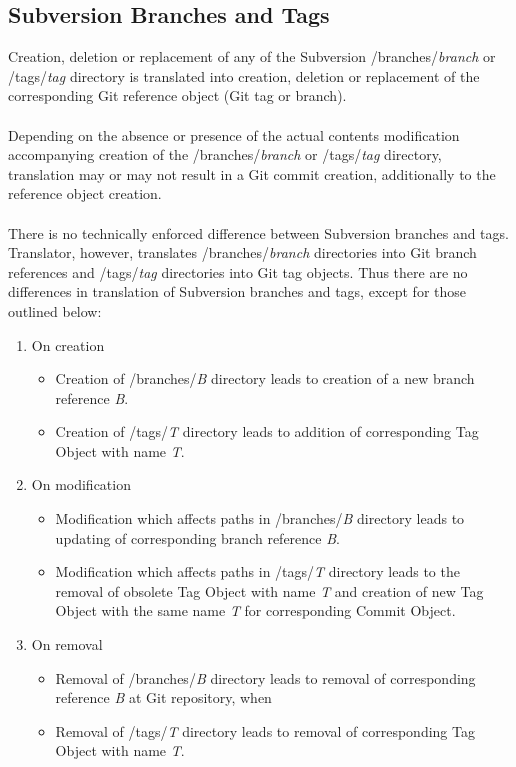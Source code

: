 \subsection{Subversion Branches and Tags}
\label{section_branches_and_tags}
\renewcommand{\figurename}{Diagram}

Creation, deletion or replacement of any of the Subversion /branches/\emph{branch} or /tags/\emph{tag} directory
is translated into creation, deletion or replacement of the corresponding Git reference object (Git tag or branch). 
\\\\
Depending on the absence or presence of the actual contents modification accompanying creation of the /branches/\emph{branch} 
or /tags/\emph{tag} directory, translation may or may not result in a Git commit creation, additionally 
to the reference object creation.
\\\\
There is no technically enforced difference between Subversion branches and tags. Translator, however, translates
/branches/\emph{branch} directories into Git branch references and /tags/\emph{tag} directories into Git tag objects.
Thus there are no differences in translation of Subversion branches and tags, except for those outlined below:
\begin{enumerate}
	\compactlist
	\item On creation
	\begin{itemize}
		\item Creation of /branches/\emph{B} directory leads to creation of a new branch reference \emph{B}.
		\item Creation of /tags/\emph{T} directory leads to addition of corresponding Tag Object with name \emph{T}.
	\end{itemize}
	\item On modification
	\begin{itemize}
		\item Modification which affects paths in /branches/\emph{B} directory leads to updating of corresponding branch reference \emph{B}.
		\item Modification which affects paths in /tags/\emph{T} directory leads to the removal of obsolete Tag Object with name \emph{T} and creation of new Tag Object with the same name \emph{T} for corresponding Commit Object.
	\end{itemize}
	\item On removal
	\begin{itemize}
		\item Removal of /branches/\emph{B} directory leads to removal of corresponding reference \emph{B} at Git repository, when
		\item Removal of /tags/\emph{T} directory leads to removal of corresponding Tag Object with name \emph{T}.
	\end{itemize}
\end{enumerate}
